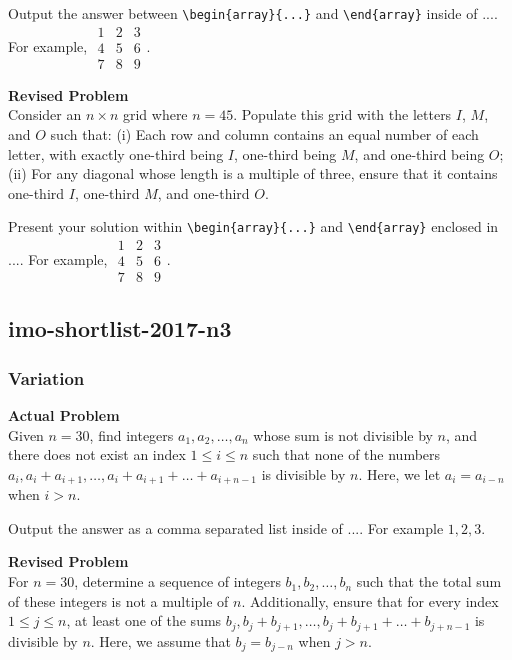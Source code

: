 Output the answer between \verb|\begin{array}{...}| and \verb|\end{array}| inside of $\boxed{...}$. For example, $\boxed{\begin{array}{ccc}1 & 2 & 3 \\ 4 & 5 & 6 \\ 7 & 8 & 9\end{array}}$.

\textbf{Revised Problem}\\
Consider an \( n \times n \) grid where \( n = 45 \). Populate this grid with the letters \( I \), \( M \), and \( O \) such that:
(i) Each row and column contains an equal number of each letter, with exactly one-third being \( I \), one-third being \( M \), and one-third being \( O \);
(ii) For any diagonal whose length is a multiple of three, ensure that it contains one-third \( I \), one-third \( M \), and one-third \( O\).

Present your solution within \verb|\begin{array}{...}| and \verb|\end{array}| enclosed in $\boxed{...}$. For example, $\boxed{\begin{array}{ccc}1 & 2 & 3 \\ 4 & 5 & 6 \\ 7 & 8 & 9\end{array}}$.

\subsection{imo-shortlist-2017-n3}
\subsubsection{Variation}
\textbf{Actual Problem}\\
Given $n = 30$, find integers $a_1,a_2,\ldots, a_n$ whose sum is not divisible by $n$, 
and there does not exist an index $1 \leq i \leq n$ such that none of the numbers $a_i,a_i+a_{i+1},\ldots,a_i+a_{i+1}+\ldots+a_{i+n-1}$ is divisible by $n$. 
Here, we let $a_i=a_{i-n}$ when $i >n$.


Output the answer as a comma separated list inside of $\boxed{...}$. For example $\boxed{1, 2, 3}$.

\textbf{Revised Problem}\\
For \( n = 30 \), determine a sequence of integers \( b_1, b_2, \ldots, b_n \) such that the total sum of these integers is not a multiple of \( n \). Additionally, ensure that for every index \( 1 \leq j \leq n \), at least one of the sums \( b_j, b_j+b_{j+1}, \ldots, b_j+b_{j+1}+\ldots+b_{j+n-1} \) is divisible by \( n \). Here, we assume that \( b_j = b_{j-n} \) when \( j > n \).

